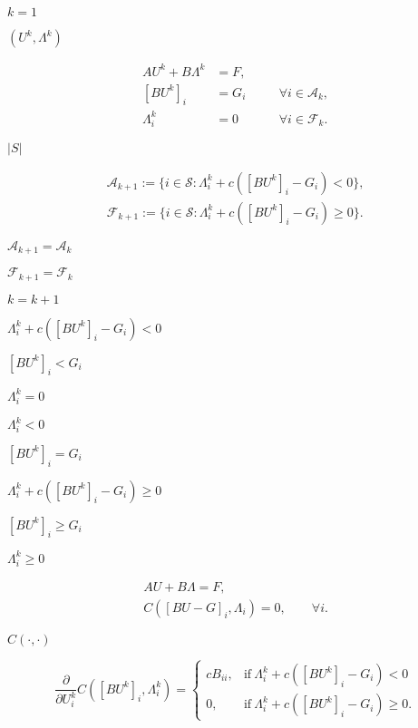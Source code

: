 \documentclass{article}
\begin{document}
$k=1$
\pagebreak

$(U^k,\Lambda^k)$
\pagebreak

\begin{align*} AU^k + B\Lambda^k &= F,\\ [BU^k]_i &= G_i\quad&&\forall i\in\mathcal{A}_k,\\ \Lambda_i^k &= 0\quad&&\forall i\in\mathcal{F}_k. \end{align*}
\pagebreak

$|S|$
\pagebreak

\begin{equation*} \begin{split} \mathcal{A}_{k+1}:=\lbrace i\in\mathcal{S}:\Lambda^k_i + c([BU^k]_i - G_i)< 0\rbrace,\\ \mathcal{F}_{k+1}:=\lbrace i\in\mathcal{S}:\Lambda^k_i + c([BU^k]_i - G_i)\geq 0\rbrace. \end{split} \end{equation*}
\pagebreak

$\mathcal{A}_{k+1}=\mathcal{A}_k$
\pagebreak

$\mathcal{F}_{k+1}=\mathcal{F}_k$
\pagebreak

$k=k+1$
\pagebreak

$\Lambda^k_i + c([BU^k]_i - G_i) < 0$
\pagebreak

$[BU^k]_i<G_i$
\pagebreak

$\Lambda^k_i=0$
\pagebreak

$\Lambda^k_i<0$
\pagebreak

$[BU^k]_i=G_i$
\pagebreak

$\Lambda^k_i + c([BU^k]_i - G_i)\geq 0$
\pagebreak

$[BU^k]_i\geq G_i$
\pagebreak

$\Lambda^k_i\geq0$
\pagebreak

\begin{eqnarray*} &A U + B\Lambda = F,&\\ &C([BU-G]_i, \Lambda_i) = 0, \qquad \forall i.& \end{eqnarray*}
\pagebreak

$C(\cdot,\cdot)$
\pagebreak

\begin{equation*} \dfrac{\partial}{\partial U^k_i}C([BU^k]_i,\Lambda^k_i) = \begin{cases} cB_{ii},& \text{if}\ \Lambda^k_i + c([BU^k]_i - G_i)< 0\\ 0,& \text{if}\ \Lambda^k_i + c([BU^k]_i - G_i)\geq 0. \end{cases} \end{equation*}
\pagebreak
\end{document}
